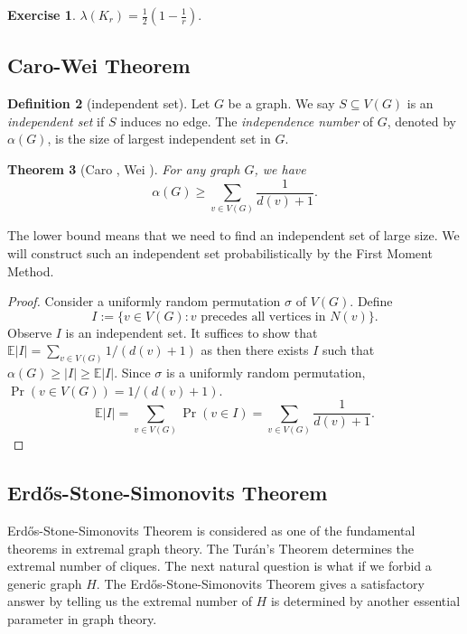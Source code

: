 \documentclass{article}
\newtheorem{theorem}{Theorem}[section]
\theoremstyle{definition}
\newtheorem{definition}[theorem]{Definition}
\newtheorem{exercise}[theorem]{Exercise}
\def\Erdos{Erd\H{o}s}
\def\Turan{Tur\'an}
\begin{document}
\begin{exercise}
    $\lambda(K_r) = \frac{1}{2} (1 - \frac{1}{r})$.
\end{exercise}

\subsection{Caro-Wei Theorem}

\begin{definition}[independent set]
    Let $G$ be a graph. We say $S \subseteq V(G)$ is an \emph{independent set} if $S$ induces no edge. The \emph{independence number} of $G$, denoted by $\alpha(G)$, is the size of largest independent set in $G$. 
\end{definition}

\begin{theorem}[Caro \cite{caro1979new}, Wei \cite{wei1981lower}]
    For any graph $G$, we have
    \[
    \alpha(G) \geq \sum_{v \in V(G)} \frac{1}{d(v) + 1}.
    \]
\end{theorem}

The lower bound means that we need to find an independent set of large size. We will construct such an independent set probabilistically by the First Moment Method. 

\begin{proof}
    Consider a uniformly random permutation $\sigma$ of $V(G)$. Define 
    \[
    I := \{v \in V(G): v \text{ precedes all vertices in $N(v)$}\}.
    \]
    Observe $I$ is an independent set. It suffices to show that $\mathbb{E}|I| = \sum_{v \in V(G)} 1/(d(v)+1)$ as then there exists $I$ such that $\alpha(G) \geq |I| \geq \mathbb{E}|I|$. Since $\sigma$ is a uniformly random permutation, $\Pr(v \in V(G)) = 1/(d(v) + 1)$.
    \[
    \mathbb{E}|I| = \sum_{v \in V(G)} \Pr(v \in I) = \sum_{v \in V(G)} \frac{1}{d(v) + 1}.
    \]
\end{proof}


\subsection{\Erdos{}-Stone-Simonovits Theorem}
\Erdos{}-Stone-Simonovits Theorem is considered as one of the fundamental theorems in extremal graph theory. The \Turan{}'s Theorem determines the extremal number of cliques. The next natural question is what if we forbid a generic graph $H$. The \Erdos{}-Stone-Simonovits Theorem gives a satisfactory answer by telling us the extremal number of $H$ is determined by another essential parameter in graph theory.
\end{document}
